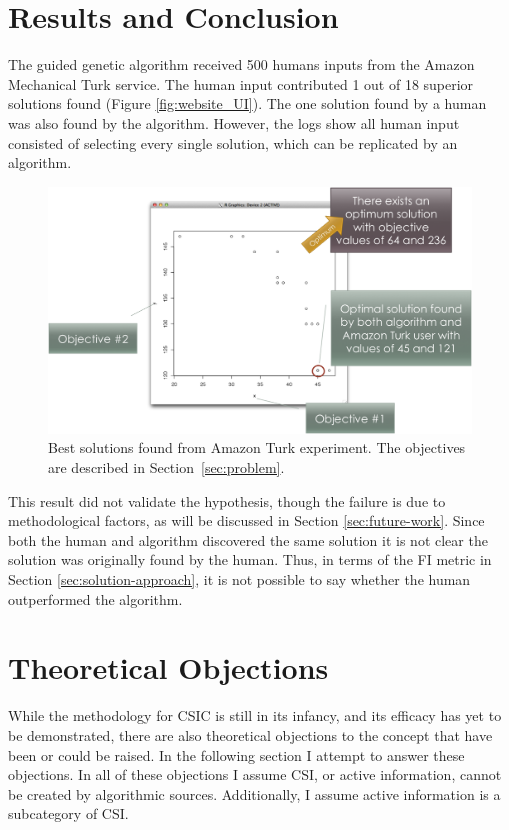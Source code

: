 \section{Results and Conclusion}
The guided genetic algorithm received 500 humans inputs from the Amazon Mechanical Turk service.  The human input contributed 1 out of 18 superior solutions found (Figure \ref{fig:website_UI}).  The one solution found by a human was also found by the algorithm.  However, the logs show all human input consisted of selecting every single solution, which can be replicated by an algorithm.

\begin{figure}[!t]
  \centering
  \includegraphics[width=4.5in]{HollowayResults}
  \caption{Best solutions found from Amazon Turk experiment.  The objectives are described in Section~\ref{sec:problem}.}
  \label{fig:results}
\end{figure}

This result did not validate the hypothesis, though the failure is  due to methodological factors, as will be discussed in Section \ref{sec:future-work}.  Since both the human and algorithm discovered the same solution it is not clear the solution was originally found by the human.  Thus, in terms of the FI metric in Section \ref{sec:solution-approach}, it is not possible to say whether the human outperformed the algorithm.

\section{Theoretical Objections}\label{sec:objections}

While the methodology for CSIC is still in its infancy, and its efficacy has yet to be demonstrated, there are also theoretical objections to the concept that have been or could be raised.  In the following section I attempt to answer these objections.  In all of these objections I assume CSI, or active information, cannot be created by algorithmic sources.  Additionally, I assume active information is a subcategory of CSI.

